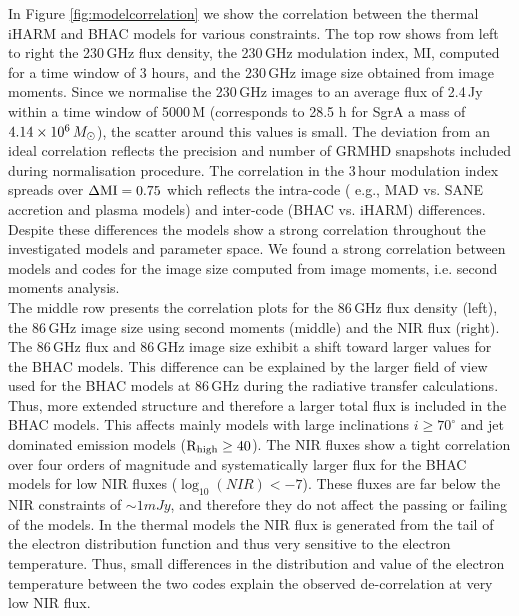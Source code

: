In Figure \ref{fig:modelcorrelation} we show the correlation between the thermal iHARM and BHAC models for various constraints.
\newline The top row shows from left to right the 230\,GHz flux density, the 230\,GHz modulation index, MI, computed for a time window of 3 hours, and the 230\,GHz image size obtained from image moments. Since we normalise the 230\,GHz images to an average flux of 2.4\,Jy within a time window of 5000\,M (corresponds to 28.5 h for SgrA a mass of $4.14\times 10^6\,M_\odot$), the scatter around this values is small. The deviation from an ideal correlation reflects the precision and number of GRMHD snapshots included during normalisation procedure.
\newline The correlation in the 3\,hour modulation index spreads over $\Delta \rm{MI}=0.75$ which reflects the intra-code ( e.g., MAD vs. SANE accretion and plasma models) and inter-code (BHAC vs. iHARM) differences. Despite these differences the models show a strong correlation throughout the investigated models and parameter space.
\newline We found a strong correlation between models and codes for the image size computed from image moments, i.e. second moments analysis. \\

The middle row presents the correlation plots for the 86\,GHz flux density (left), the 86\,GHz image size using second moments (middle) and the NIR flux (right). The 86\,GHz flux and 86\,GHz image size exhibit a shift toward larger values for the BHAC models. This difference can be explained by the larger field of view used for the BHAC models at 86\,GHz during the radiative transfer calculations. Thus, more extended structure and therefore a larger total flux is included in the BHAC models. This affects mainly models with large inclinations $i\geq70^\circ$ and jet dominated emission models ($\rm{R}_{\rm high}\geq 40$).
\newline The NIR fluxes show a tight correlation over four orders of magnitude and systematically larger flux for the BHAC models for low NIR fluxes ($\log_{10}(NIR)<-7$). These fluxes are far below the NIR constraints of $\sim 1mJy$, and therefore they do not affect the passing or failing of the models. In the thermal models the NIR flux is generated from the tail of the electron distribution function and thus very sensitive to the electron temperature. Thus, small differences in the distribution and value of the electron temperature between the two codes explain the observed de-correlation at very low NIR flux.  \\

